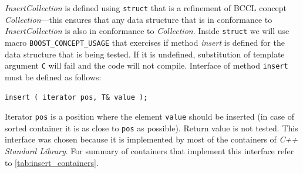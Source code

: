 \documentclass[thesis=B,english]{FITthesis}[2019/03/21]
\begin{document}
\emph{InsertCollection} is defined using \texttt{struct} that is a refinement of BCCL concept \emph{Collection}---this ensures that any data structure that is in conformance to \emph{InsertCollection} is also in conformance to \emph{Collection}. Inside \texttt{struct} we will use macro \texttt{BOOST\_CONCEPT\_USAGE} that exercises if method \emph{insert} is defined for the data structure that is being tested. If it is undefined, substitution of template argument \texttt{C} will fail and the code will not compile. Interface of method \texttt{insert} must be defined as follows:

\begin{center}
\centering
\texttt{insert ( iterator pos, T\& value );}
\end{center}

Iterator \texttt{pos} is a position where the element \texttt{value} should be inserted (in case of sorted container it is as close to \texttt{pos} as possible). Return value is not tested. This interface was chosen because it is implemented by most of the containers of \emph{C++ Standard Library}. For summary of containers that implement this interface refer to \autoref{tab:insert_containers}.
\end{document}
